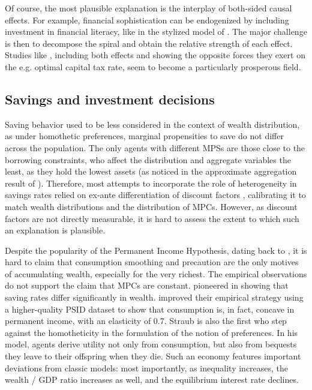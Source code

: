 \documentclass[12pt]{article}
\begin{document}
Of course, the most plausible explanation is the interplay of both-sided causal effects. For example, financial sophistication can be endogenized by including investment in financial literacy, like in the stylized model of \textcite{spataro2017}. The major challenge is then to decompose the spiral and obtain the relative strength of each effect. Studies like \textcite{gaillard2023}, including both effects and showing the opposite forces they exert on the e.g. optimal capital tax rate, seem to become a particularly prosperous field.

\subsection{Savings and investment decisions}

Saving behavior used to be less considered in the context of wealth distribution, as under homothetic preferences, marginal propensities to save do not differ across the population. The only agents with different MPSs are those close to the borrowing constraints, who affect the distribution and aggregate variables the least, as they hold the lowest assets (as noticed in the approximate aggregation result of \textcite{krusell1998}). Therefore, most attempts to incorporate the role of heterogeneity in savings rates relied on ex-ante differentiation of discount factors \textcite{benhabib2011, carroll2017}, calibrating it to match wealth distributions and the distribution of MPCs. However, as discount factors are not directly measurable, it is hard to assess the extent to which such an explanation is plausible.

Despite the popularity of the Permanent Income Hypothesis, dating back to \textcite{friedman1957}, it is hard to claim that consumption smoothing and precaution are the only motives of accumulating wealth, especially for the very richest. The empirical observations do not support the claim that MPCs are constant. \textcite{dynan2004} pioneered in showing that saving rates differ significantly in wealth. \textcite{straub2019} improved their empirical strategy using a higher-quality PSID dataset to show that consumption is, in fact, concave in permanent income, with an elasticity of 0.7. Straub is also the first who step against the homotheticity in the formulation of the notion of preferences. In his model, agents derive utility not only from consumption, but also from bequests they leave to their offspring when they die. Such an economy features important deviations from classic models: most importantly, as inequality increases, the wealth / GDP ratio increases as well, and the equilibrium interest rate declines.
\end{document}
